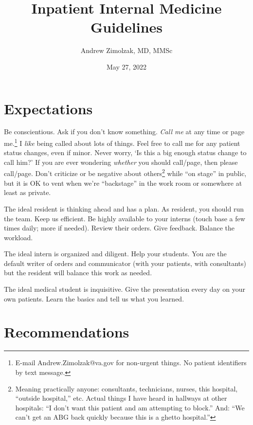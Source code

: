 \documentclass{tufte-handout}
\title{Inpatient Internal Medicine Guidelines}
\author{Andrew Zimolzak, MD, MMSc}
\date{May 27, 2022}
\begin{document}
\maketitle

\section{Expectations}

Be conscientious. Ask if you don't know something. \emph{Call me} at
any time or page me.\footnote{E-mail
Andrew.Zimolzak@va.gov for non-urgent things. No patient identifiers
by text message.} I \emph{like} being called about lots of things.
Feel free to call me for any patient status changes, even if minor.
Never worry, `Is this a big enough status change to call him?' If you
are ever wondering \emph{whether} you should call/page, then please
call/page. Don't criticize or be negative about
others\footnote{Meaning practically anyone: consultants, technicians,
nurses, this hospital, ``outside hospital,'' etc. Actual things I have
heard in hallways at other hospitals: ``I don't want this patient and
am attempting to block.'' And: ``We can't get an ABG back quickly
because this is a ghetto hospital.''} while ``on stage'' in public,
but it is OK to vent when we're ``backstage'' in the work room or
somewhere at least as private.

The ideal resident is thinking ahead and has a plan. As resident, you
should run the team. Keep us efficient. Be highly available to your
interns (touch base a few times daily; more if needed). Review their
orders. Give feedback. Balance the workload.

The ideal intern is organized and diligent. Help your students. You
are the default writer of orders and communicator (with your patients,
with consultants) but the resident will balance this work as needed.

The ideal medical student is inquisitive. Give the presentation every
day on your own patients. Learn the basics and tell us what you
learned.

\section{Recommendations}

\end{document}
